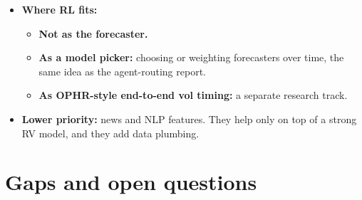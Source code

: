 \documentclass{article}
\begin{document}
\begin{itemize}
\begin{enumerate}
\item \textbf{Signal P\&L:} whether the forecast's VRP signal picks winning long/\allowbreak{}short gamma trades. OPHR warns these two can disagree.

\end{enumerate}

\item \textbf{Where RL fits:}

\begin{itemize}

\item \textbf{Not as the forecaster.}

\item \textbf{As a model picker:} choosing or weighting forecasters over time, the same idea as the agent-routing report.

\item \textbf{As OPHR-style end-to-end vol timing:} a separate research track.

\end{itemize}

\item \textbf{Lower priority:} news and NLP features. They help only on top of a strong RV model, and they add data plumbing.

\end{itemize}

\section{Gaps and open questions}
\end{document}
